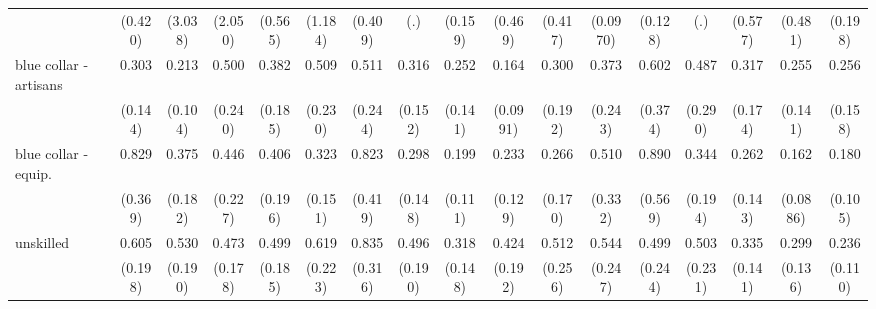 {\begin{tabular}{l*{16}{c}}
                    &     (0.420)         &     (3.038)         &     (2.050)         &     (0.565)         &     (1.184)         &     (0.409)         &         (.)         &     (0.159)         &     (0.469)         &     (0.417)         &    (0.0970)         &     (0.128)         &         (.)         &     (0.577)         &     (0.481)         &     (0.198)         \\
[1em]
blue collar - artisans&       0.303\sym{*}  &       0.213\sym{**} &       0.500         &       0.382\sym{*}  &       0.509         &       0.511         &       0.316\sym{*}  &       0.252\sym{*}  &       0.164\sym{**} &       0.300         &       0.373         &       0.602         &       0.487         &       0.317\sym{*}  &       0.255\sym{*}  &       0.256\sym{*}  \\
                    &     (0.144)         &     (0.104)         &     (0.240)         &     (0.185)         &     (0.230)         &     (0.244)         &     (0.152)         &     (0.141)         &    (0.0991)         &     (0.192)         &     (0.243)         &     (0.374)         &     (0.290)         &     (0.174)         &     (0.141)         &     (0.158)         \\
[1em]
blue collar - equip.&       0.829         &       0.375\sym{*}  &       0.446         &       0.406         &       0.323\sym{*}  &       0.823         &       0.298\sym{*}  &       0.199\sym{**} &       0.233\sym{**} &       0.266\sym{*}  &       0.510         &       0.890         &       0.344         &       0.262\sym{*}  &       0.162\sym{***}&       0.180\sym{**} \\
                    &     (0.369)         &     (0.182)         &     (0.227)         &     (0.196)         &     (0.151)         &     (0.419)         &     (0.148)         &     (0.111)         &     (0.129)         &     (0.170)         &     (0.332)         &     (0.569)         &     (0.194)         &     (0.143)         &    (0.0886)         &     (0.105)         \\
[1em]
unskilled           &       0.605         &       0.530         &       0.473\sym{*}  &       0.499         &       0.619         &       0.835         &       0.496         &       0.318\sym{*}  &       0.424         &       0.512         &       0.544         &       0.499         &       0.503         &       0.335\sym{**} &       0.299\sym{**} &       0.236\sym{**} \\
                    &     (0.198)         &     (0.190)         &     (0.178)         &     (0.185)         &     (0.223)         &     (0.316)         &     (0.190)         &     (0.148)         &     (0.192)         &     (0.256)         &     (0.247)         &     (0.244)         &     (0.231)         &     (0.141)         &     (0.136)         &     (0.110)         \\

\end{tabular}}
